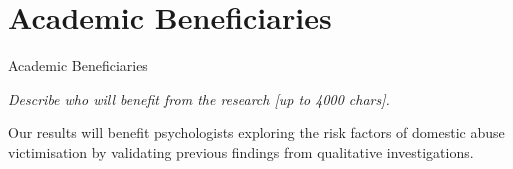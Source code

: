 \documentclass[11pt, a4paper]{article}
\begin{document}
\section{Academic Beneficiaries}

Academic Beneficiaries

%
%
%
%
%
%
%
%
%
%
%
%
%
%
%

\textit{Describe who will benefit from the research [up to 4000 chars].}


Our results will benefit psychologists exploring the risk factors of domestic abuse victimisation by validating previous findings from qualitative investigations.
\end{document}
